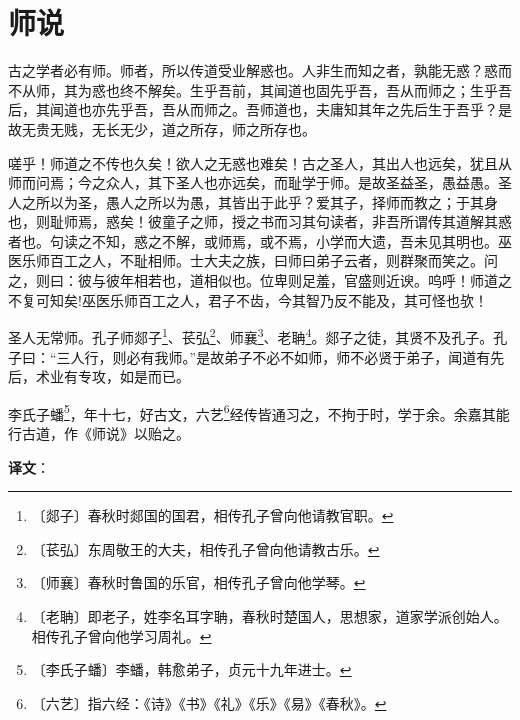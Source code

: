 \documentclass[12pt,UTF-8,openany]{ctexbook}
\begin{document}
\chapter{师说}

\begin{normalsize}
    
    古之学者必有师。师者，所以传道受业解惑也。人非生而知之者，孰能无惑？惑而不从师，其为惑也终不解矣。生乎吾前，其闻道也固先乎吾，吾从而师之；生乎吾后，其闻道也亦先乎吾，吾从而师之。吾师道也，夫庸知其年之先后生于吾乎？是故无贵无贱，无长无少，道之所存，师之所存也。
    
    嗟乎！师道之不传也久矣！欲人之无惑也难矣！古之圣人，其出人也远矣，犹且从师而问焉；今之众人，其下圣人也亦远矣，而耻学于师。是故圣益圣，愚益愚。圣人之所以为圣，愚人之所以为愚，其皆出于此乎？爱其子，择师而教之；于其身也，则耻师焉，惑矣！彼童子之师，授之书而习其句读者，非吾所谓传其道解其惑者也。句读之不知，惑之不解，或师焉，或不焉，小学而大遗，吾未见其明也。巫医乐师百工之人，不耻相师。士大夫之族，曰师曰弟子云者，则群聚而笑之。问之，则曰：彼与彼年相若也，道相似也。位卑则足羞，官盛则近谀。呜呼！师道之不复可知矣!巫医乐师百工之人，君子不齿，今其智乃反不能及，其可怪也欤！
    
    圣人无常师。孔子师郯子\footnote{〔郯子〕春秋时郯国的国君，相传孔子曾向他请教官职。}、苌弘\footnote{〔苌弘〕东周敬王的大夫，相传孔子曾向他请教古乐。}、师襄\footnote{〔师襄〕春秋时鲁国的乐官，相传孔子曾向他学琴。}、老聃\footnote{〔老聃〕即老子，姓李名耳字聃，春秋时楚国人，思想家，道家学派创始人。相传孔子曾向他学习周礼。}。郯子之徒，其贤不及孔子。孔子曰：“三人行，则必有我师。”是故弟子不必不如师，师不必贤于弟子，闻道有先后，术业有专攻，如是而已。
    
    李氏子蟠\footnote{〔李氏子蟠〕李蟠，韩愈弟子，贞元十九年进士。}，年十七，好古文，六艺\footnote{〔六艺〕指六经：《诗》《书》《礼》《乐》《易》《春秋》。}经传皆通习之，不拘于时，学于余。余嘉其能行古道，作《师说》以贻之。
\end{normalsize}


\newpage

\textbf{译文}：

\vspace{1em}
\end{document}
